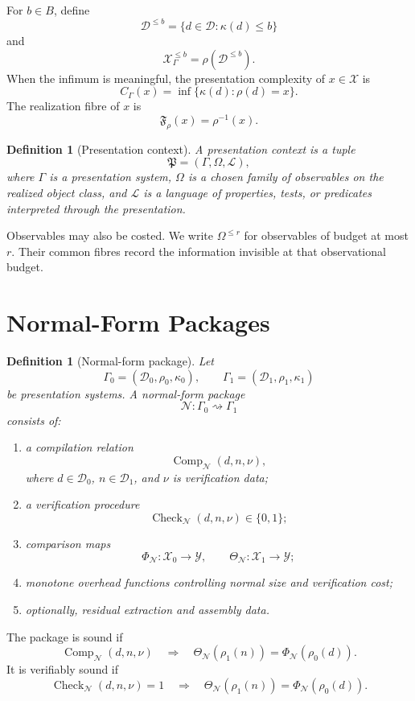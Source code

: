 \documentclass[11pt]{article}
\newtheorem{definition}[theorem]{Definition}
\DeclareMathOperator{\CheckNF}{Check}
\DeclareMathOperator{\Comp}{Comp}
\begin{document}
For \(b\in B\), define
\[
\mathcal D^{\leq b}=\{d\in\mathcal D:\kappa(d)\leq b\}
\]
and
\[
\mathcal X_\Gamma^{\leq b}=\rho(\mathcal D^{\leq b}).
\]
When the infimum is meaningful, the presentation complexity of \(x\in\mathcal X\) is
\[
C_\Gamma(x)=\inf\{\kappa(d):\rho(d)=x\}.
\]
The realization fibre of \(x\) is
\[
\mathfrak F_\rho(x)=\rho^{-1}(x).
\]

\begin{definition}[Presentation context]
A presentation context is a tuple
\[
\mathfrak P=(\Gamma,\Omega,\mathcal L),
\]
where \(\Gamma\) is a presentation system, \(\Omega\) is a chosen family of observables on the realized object class, and \(\mathcal L\) is a language of properties, tests, or predicates interpreted through the presentation.
\end{definition}

Observables may also be costed. We write \(\Omega^{\leq r}\) for observables of budget at most \(r\). Their common fibres record the information invisible at that observational budget.

\section{Normal-Form Packages}

\begin{definition}[Normal-form package]
Let
\[
\Gamma_0=(\mathcal D_0,\rho_0,\kappa_0),
\qquad
\Gamma_1=(\mathcal D_1,\rho_1,\kappa_1)
\]
be presentation systems. A normal-form package
\[
\mathcal N:\Gamma_0\rightsquigarrow\Gamma_1
\]
consists of:
\begin{enumerate}[label=\textup{(\roman*)}]
\item a compilation relation
\[
\Comp_{\mathcal N}(d,n,\nu),
\]
where \(d\in\mathcal D_0\), \(n\in\mathcal D_1\), and \(\nu\) is verification data;
\item a verification procedure
\[
\CheckNF_{\mathcal N}(d,n,\nu)\in\{0,1\};
\]
\item comparison maps
\[
\Phi_{\mathcal N}:\mathcal X_0\to\mathcal Y,
\qquad
\Theta_{\mathcal N}:\mathcal X_1\to\mathcal Y;
\]
\item monotone overhead functions controlling normal size and verification cost;
\item optionally, residual extraction and assembly data.
\end{enumerate}
\end{definition}

The package is sound if
\[
\Comp_{\mathcal N}(d,n,\nu)
\quad\Longrightarrow\quad
\Theta_{\mathcal N}(\rho_1(n))=\Phi_{\mathcal N}(\rho_0(d)).
\]
It is verifiably sound if
\[
\CheckNF_{\mathcal N}(d,n,\nu)=1
\quad\Longrightarrow\quad
\Theta_{\mathcal N}(\rho_1(n))=\Phi_{\mathcal N}(\rho_0(d)).
\]
\end{document}
